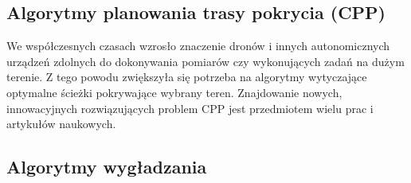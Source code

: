 \subsection{Algorytmy planowania trasy pokrycia (CPP)}

We współczesnych czasach wzrosło znaczenie dronów i innych autonomicznych urządzeń zdolnych do dokonywania pomiarów czy wykonujących zadań na dużym terenie. Z tego powodu zwiększyła się potrzeba na algorytmy wytyczające optymalne ścieżki pokrywające wybrany teren. Znajdowanie nowych, innowacyjnych rozwiązujących problem CPP jest przedmiotem wielu prac i artykułów naukowych. 

\subsection{Algorytmy wygładzania}

